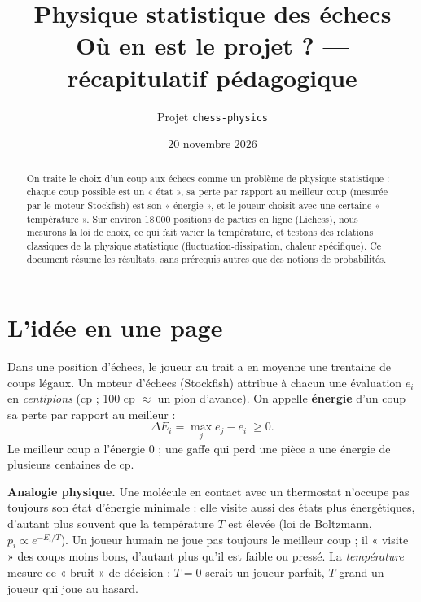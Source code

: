 \documentclass[11pt,a4paper]{article}
\title{\textbf{Physique statistique des échecs}\\[2pt]\large Où en est le projet ? — récapitulatif pédagogique}
\author{Projet \texttt{chess-physics}}
\date{20 novembre 2026}
\newcommand{\DE}{\Delta E}
\begin{document}
\maketitle

\begin{abstract}
On traite le choix d'un coup aux échecs comme un problème de physique statistique : chaque coup possible est un
« état », sa perte par rapport au meilleur coup (mesurée par le moteur Stockfish) est son « énergie », et le joueur
choisit avec une certaine « température ». Sur environ 18\,000 positions de parties en ligne (Lichess), nous
mesurons la loi de choix, ce qui fait varier la température, et testons des relations classiques de la physique
statistique (fluctuation-dissipation, chaleur spécifique). Ce document résume les résultats, sans prérequis
autres que des notions de probabilités.
\end{abstract}

\tableofcontents
\newpage

\section{L'idée en une page}

Dans une position d'échecs, le joueur au trait a en moyenne une trentaine de coups légaux. Un moteur d'échecs
(Stockfish) attribue à chacun une évaluation $e_i$ en \emph{centipions} (cp ; 100 cp $\approx$ un pion d'avance).
On appelle \textbf{énergie} d'un coup sa perte par rapport au meilleur :
\begin{equation}
  \DE_i = \max_j e_j - e_i \;\ge 0 .
\end{equation}
Le meilleur coup a l'énergie $0$ ; une gaffe qui perd une pièce a une énergie de plusieurs centaines de cp.

\begin{intuition}
\textbf{Analogie physique.} Une molécule en contact avec un thermostat n'occupe pas toujours son état d'énergie
minimale : elle visite aussi des états plus énergétiques, d'autant plus souvent que la température $T$ est élevée
(loi de Boltzmann, $p_i \propto e^{-E_i/T}$). Un joueur humain ne joue pas toujours le meilleur coup ; il
« visite » des coups moins bons, d'autant plus qu'il est faible ou pressé. La \emph{température} mesure ce
« bruit » de décision : $T = 0$ serait un joueur parfait, $T$ grand un joueur qui joue au hasard.
\end{intuition}
\end{document}
